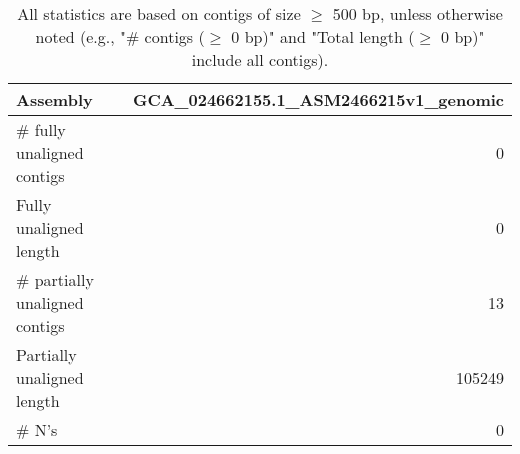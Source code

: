 \documentclass[12pt,a4paper]{article}
\begin{document}
\begin{table}[ht]
\begin{center}
\caption{All statistics are based on contigs of size $\geq$ 500 bp, unless otherwise noted (e.g., "\# contigs ($\geq$ 0 bp)" and "Total length ($\geq$ 0 bp)" include all contigs).}
\begin{tabular}{|l*{1}{|r}|}
\hline
Assembly & GCA\_024662155.1\_ASM2466215v1\_genomic \\ \hline
\# fully unaligned contigs & 0 \\ \hline
Fully unaligned length & 0 \\ \hline
\# partially unaligned contigs & 13 \\ \hline
Partially unaligned length & 105249 \\ \hline
\# N's & 0 \\ \hline
\end{tabular}
\end{center}
\end{table}
\end{document}
